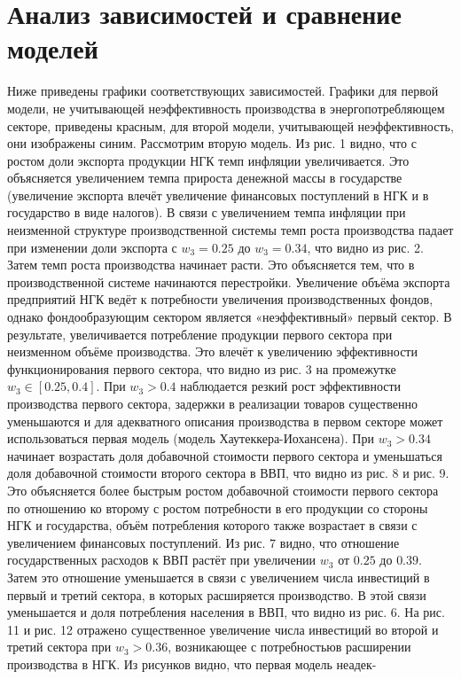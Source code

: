 \documentclass[12pt]{article}
\theoremstyle{rusdef}
\begin{document}
\section{Анализ зависимостей и сравнение моделей}
Ниже приведены графики соответствующих зависимостей. Графики для первой модели, не учитывающей неэффективность производства в энергопотребляющем секторе, приведены красным, для второй модели, учитывающей неэффективность, они изображены синим. Рассмотрим вторую модель. Из рис. 1 видно, что с ростом доли экспорта продукции НГК темп инфляции увеличивается. Это объясняется увеличением темпа прироста денежной массы в государстве (увеличение экспорта влечёт увеличение финансовых поступлений в НГК и в государство в виде налогов). В связи с увеличением темпа инфляции при неизменной структуре производственной системы темп роста производства падает при изменении
доли экспорта с $w_3 = 0.25$ до $w_3 = 0.34$, что видно из рис. 2. Затем темп роста производства начинает расти. Это объясняется тем, что в производственной системе начинаются перестройки. Увеличение объёма экспорта предприятий НГК ведёт к потребности увеличения производственных фондов, однако фондообразующим сектором является «неэффективный» первый сектор. В результате, увеличивается потребление продукции первого сектора при неизменном объёме производства. Это влечёт к увеличению эффективности функционирования первого сектора, что видно из рис. 3 на промежутке $w_3 \in [0.25, 0.4]$. При $w_3 > 0.4$ наблюдается резкий рост эффективности производства первого сектора, задержки в реализации товаров существенно уменьшаются и для адекватного описания производства в первом секторе может использоваться первая модель (модель Хаутеккера-Иохансена). При $w_3 > 0.34$ начинает возрастать доля добавочной стоимости первого сектора и уменьшаться доля добавочной стоимости второго сектора в ВВП, что видно из рис. 8 и рис. 9. Это объясняется более быстрым ростом добавочной стоимости первого сектора по отношению ко второму с ростом потребности в его продукции со стороны НГК и государства, объём
потребления которого также возрастает в связи с увеличением финансовых поступлений. Из рис. 7 видно, что отношение государственных расходов к ВВП растёт при увеличении $w_3$ от $0.25$ до $0.39$. Затем это отношение уменьшается в связи с увеличением числа инвестиций в первый и третий сектора, в которых расширяется
производство. В этой связи уменьшается и доля потребления населения в ВВП, что видно из рис. 6. На рис. 11 и рис. 12 отражено существенное увеличение числа инвестиций во второй и третий сектора при $w_3 > 0.36$, возникающее с потребностьюв расширении производства в НГК. Из рисунков видно, что первая модель неадек-
\end{document}
